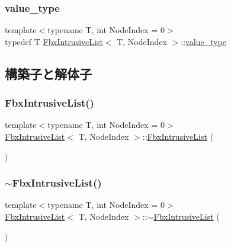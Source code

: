 \subsubsection{\texorpdfstring{value\+\_\+type}{value\_type}}
{\footnotesize\ttfamily template$<$typename T, int Node\+Index = 0$>$ \\
typedef T \hyperlink{class_fbx_intrusive_list}{Fbx\+Intrusive\+List}$<$ T, Node\+Index $>$\+::\hyperlink{class_fbx_intrusive_list_a218aebbf21a304ade2a570f47da62751}{value\+\_\+type}}



\subsection{構築子と解体子}
\mbox{\label{class_fbx_intrusive_list_a438d0989f5ff6755cd58bec5e85ddaac}} 
\subsubsection{\texorpdfstring{Fbx\+Intrusive\+List()}{FbxIntrusiveList()}}
{\footnotesize\ttfamily template$<$typename T, int Node\+Index = 0$>$ \\
\hyperlink{class_fbx_intrusive_list}{Fbx\+Intrusive\+List}$<$ T, Node\+Index $>$\+::\hyperlink{class_fbx_intrusive_list}{Fbx\+Intrusive\+List} (\begin{DoxyParamCaption}{ }\end{DoxyParamCaption})}

\mbox{\label{class_fbx_intrusive_list_a4528bf939398fb9281478a8faf75891a}} 
\subsubsection{\texorpdfstring{$\sim$\+Fbx\+Intrusive\+List()}{~FbxIntrusiveList()}}
{\footnotesize\ttfamily template$<$typename T, int Node\+Index = 0$>$ \\
\hyperlink{class_fbx_intrusive_list}{Fbx\+Intrusive\+List}$<$ T, Node\+Index $>$\+::$\sim$\hyperlink{class_fbx_intrusive_list}{Fbx\+Intrusive\+List} (\begin{DoxyParamCaption}{ }\end{DoxyParamCaption})}



